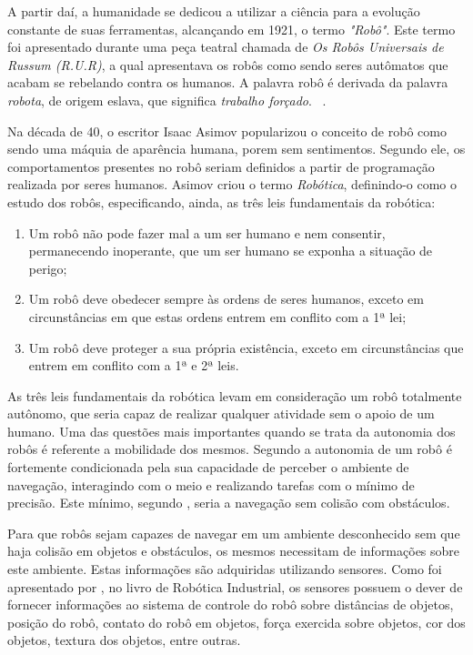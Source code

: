 	A partir daí, a humanidade se dedicou a utilizar a ciência para a evolução constante de suas ferramentas, alcançando em 1921, o termo \textit{"Robô"}. Este termo foi apresentado durante uma peça teatral chamada de \textit{Os Robôs Universais de Russum (R.U.R)}, a qual apresentava os robôs como sendo seres autômatos que acabam se rebelando contra os humanos. A palavra robô é derivada da palavra \textit{robota}, de origem eslava, que significa \textit{trabalho forçado}. ~\cite{roboticaIndustrial}.

	Na década de 40, o escritor Isaac Asimov popularizou o conceito de robô como sendo uma máquia de aparência humana, porem sem sentimentos. Segundo ele, os comportamentos presentes no robô seriam definidos a partir de programação realizada por seres humanos. Asimov criou o termo \textit{Robótica}, definindo-o como o estudo dos robôs, especificando, ainda, as três leis fundamentais da robótica:

	\begin{enumerate}
		\item Um robô não pode fazer mal a um ser humano e nem consentir, permanecendo inoperante,
 que um ser humano se exponha a situação de perigo; 
 		\item Um robô deve obedecer sempre às ordens de seres humanos, exceto em circunstâncias em
 que estas ordens entrem em conflito com a 1ª lei; 
 		\item Um robô deve proteger a sua própria existência, exceto em circunstâncias que entrem em
 conflito com a 1ª e 2ª leis.
	\end{enumerate}

	As três leis fundamentais da robótica levam em consideração um robô totalmente autônomo, que seria capaz de realizar qualquer atividade sem o apoio de um humano. Uma das questões mais importantes quando se trata da autonomia dos robôs é referente a mobilidade dos mesmos. Segundo \cite{localizacaoEMapeamentoPaulo} a autonomia de um robô é fortemente condicionada pela sua capacidade de perceber o ambiente de navegação, interagindo com o meio e realizando tarefas com o mínimo de precisão. Este mínimo, segundo \cite{localizacaoEMapeamentoPaulo}, seria a navegação sem colisão com obstáculos. 

	Para que robôs sejam capazes de navegar em um ambiente desconhecido sem que haja colisão em objetos e obstáculos, os mesmos necessitam de informações sobre este ambiente. Estas informações são adquiridas utilizando sensores. Como foi apresentado por \cite{interacaoRoboAmbiente}, no livro de Robótica Industrial, os sensores possuem o dever de fornecer informações ao sistema de controle do robô sobre distâncias de objetos, posição do robô, contato do robô em objetos, força exercida sobre objetos, cor dos objetos, textura dos objetos, entre outras.


